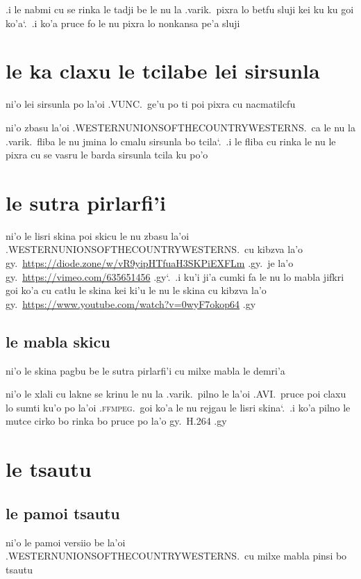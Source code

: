 \documentclass{report}
\newcommand\sds{\spacefactor\sfcode`.\ \space}
\begin{document}
.i le nabmi cu se rinka le tadji be le nu la .varik.\ pixra lo betfu sluji kei ku ku goi ko'a\sds  .i ko'a pruce fo le nu pixra lo nonkansa pe'a sluji

\section{le ka claxu le tcilabe lei sirsunla}
ni'o lei sirsunla po la'oi .VUNC.\ ge'u po ti poi pixra cu nacmatilcfu

ni'o zbasu la'oi .WESTERNUNIONSOFTHECOUNTRYWESTERNS.\ ca le nu la .varik.\ fliba le nu jmina lo cmalu sirsunla bo tcila\sds  .i le fliba cu rinka le nu le pixra cu se vasru le barda sirsunla tcila ku po'o

\section{le sutra pirlarfi'i}
ni'o le lisri skina poi skicu le nu zbasu la'oi .WESTERNUNIONSOFTHECOUNTRYWESTERNS.\ cu kibzva la'o gy.\ \url{https://diode.zone/w/vR9yipHTfuaH3SKPiEXFLm} .gy.\ je la'o gy.\ \url{https://vimeo.com/635651456} .gy\sds  .i ku'i ji'a cumki fa le nu lo mabla jifkri goi ko'a cu catlu le skina kei ki'u le nu le skina cu kibzva la'o gy.\ \url{https://www.youtube.com/watch?v=0wyF7okop64} .gy

\subsection{le mabla skicu}
ni'o le skina pagbu be le sutra pirlarfi'i cu milxe mabla le demri'a

ni'o le xlali cu lakne se krinu le nu la .varik.\ pilno le la'oi .AVI.\ pruce poi claxu lo sumti ku'o po la'oi .\textsc{ffmpeg}.\ goi ko'a le nu rejgau le lisri skina\sds  .i ko'a pilno le mutce cirko bo rinka bo pruce po la'o gy.\ H.264 .gy

\section{le tsautu}
\subsection{le pamoi tsautu}
ni'o le pamoi versiio be la'oi .WESTERNUNIONSOFTHECOUNTRYWESTERNS.\ cu milxe mabla pinsi bo tsautu
\end{document}

